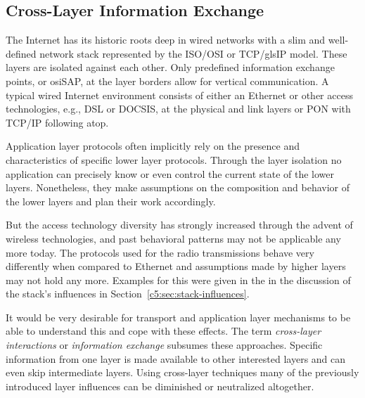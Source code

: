 \subsection{Cross-Layer Information Exchange}
\label{c5:sec:crosslayerhinting}

The Internet has its historic roots deep in wired networks with a slim and well-defined network stack represented by the \gls{ISO}/\gls{OSI} or \gls{TCP}/gls{IP} model. These layers are isolated against each other. Only predefined information exchange points, or \gls{osiSAP}, at the layer borders allow for vertical communication. A typical wired Internet environment consists of either an Ethernet or other access technologies, e.g., \gls{DSL} or \gls{DOCSIS}, at the physical and link layers or \gls{PON} with \gls{TCP}/\gls{IP} following atop.

Application layer protocols often implicitly rely on the presence and characteristics of specific lower layer protocols. Through the layer isolation no application can precisely know or even control the current state of the lower layers. Nonetheless, they make assumptions on the composition and behavior of the lower layers and plan their work accordingly. 

But the access technology diversity has strongly increased through the advent of wireless technologies, and past behavioral patterns may not be applicable any more today. The protocols used for the radio transmissions behave very differently when compared to Ethernet and assumptions made by higher layers may not hold any more. Examples for this were given in the in the discussion of the stack's influences in Section~\ref{c5:sec:stack-influences}.

It would be very desirable for transport and application layer mechanisms to be able to understand this and cope with these effects. The term \textit{cross-layer interactions} or \textit{information exchange} subsumes these approaches. Specific information from one layer is made available to other interested layers and can even skip intermediate layers. Using cross-layer techniques many of the previously introduced layer influences can be diminished or neutralized altogether.

